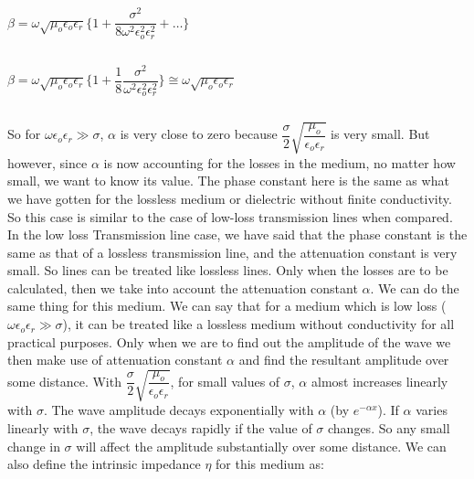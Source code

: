 \begin{center}
$\beta = \omega\sqrt{\mu_{o}\epsilon_{o}\epsilon_{r}}\Bigg\{1 + \dfrac{\sigma^{2}}{8\omega^{2}\epsilon_{o}^{2}\epsilon_{r}^{2}} + \dots\Bigg\}$
\end{center}
\begin{equation}\end{equation}


\begin{center}
$\beta = \omega\sqrt{\mu_{o}\epsilon_{o}\epsilon_{r}}\Bigg\{1 + \dfrac{1}{8} \dfrac{\sigma^{2}}{\omega^{2}\epsilon_{o}^{2}\epsilon_{r}^{2}}\Bigg\} \cong \omega\sqrt{\mu_{o}\epsilon_{o}\epsilon_{r}}$
\end{center}
\begin{equation}\end{equation}

So for $\omega\epsilon_{o}\epsilon_{r} \gg \sigma$, $\alpha$ is very close to zero because $\dfrac{\sigma}{2}\sqrt{\dfrac{\mu_{o}}{\epsilon_{o}\epsilon_{r}}}$ is very small. But however, since $\alpha$ is now accounting for the losses in the medium, no matter how small, we want to know its value. The phase constant here is the same as what we have gotten for the lossless medium or dielectric without finite conductivity. So this case is similar to the case of low-loss transmission lines when compared.
In the low loss Transmission line case, we have said that the phase constant is the same as that of a lossless transmission line, and the attenuation constant is very small. So lines can be treated like lossless lines. Only when the losses are to be calculated, then we take into account the attenuation constant $\alpha$. We can do the same thing for this medium. We can say that for a medium which is low loss ($\omega\epsilon_{o}\epsilon_{r} \gg \sigma$), it can be treated like a lossless medium without conductivity for all practical purposes. Only when we are to find out the amplitude of the wave we then make use of attenuation constant $\alpha$ and find the resultant amplitude over some distance. With $\dfrac{\sigma}{2}\sqrt{\dfrac{\mu_{o}}{\epsilon_{o}\epsilon_{r}}}$, for small values of $\sigma$, $\alpha$ almost increases linearly with $\sigma$. The wave amplitude decays exponentially with $\alpha$ (by $e^{-\alpha x}$). If $\alpha$ varies linearly with $\sigma$, the wave decays rapidly if the value of $\sigma$ changes. So any small change in $\sigma$ will affect the amplitude substantially over some distance. 
We can also define the intrinsic impedance $\eta$ for this medium as:
